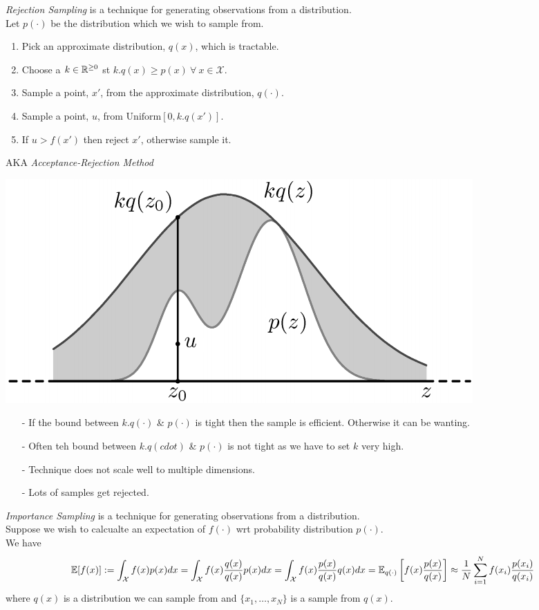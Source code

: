 \documentclass[11pt,a4paper]{article}
\begin{document}
\textit{Rejection Sampling} is a technique for generating observations from a distribution.\\
Let $p(\cdot)$ be the distribution which we wish to sample from.
\begin{enumerate}
	\item Pick an approximate distribution, $q(x)$, which is tractable.
	\item Choose a $k\in\mathbb{R}^{\geq0}$ st $k.q(x)\geq p(x)\ \forall\ x\in\mathcal{X}$.
	\item Sample a point, $x'$, from the approximate distribution, $q(\cdot)$.
	\item Sample a point, $u$, from $\text{Uniform}[0,k.q(x')]$.
	\item If $u>f(x')$ then reject $x'$, otherwise sample it.
\end{enumerate}
\nb AKA \textit{Acceptance-Rejection Method}
\begin{center}
\includegraphics[scale=.5]{img/rejectionSampling.png}
\end{center}

\begin{itemize}
	\item[-] If the bound between $k.q(\cdot)$ \& $p(\cdot)$ is tight then the sample is efficient. Otherwise it can be wanting.
	\item[-] Often teh bound between $k.q(cdot)$ \& $p(\cdot)$ is not tight as we have to set $k$ very high.
	\item[-] Technique does not scale well to multiple dimensions.
	\item[-] Lots of samples get rejected.
\end{itemize}

\textit{Importance Sampling} is a technique for generating observations from a distribution.\\
Suppose we wish to calcualte an expectation of $f(\cdot)$ wrt probability distribution $p(\cdot)$.\\
We have
$$\displaystyle{\mathbb{E}[f(x)]:=\int_\mathcal{X} f(x)p(x)dx=\int_\mathcal{X} f(x)\frac{q(x)}{q(x)}p(x)dx=\int_\mathcal{X} f(x)\frac{p(x)}{q(x)}q(x)dx=\mathbb{E}_{q(\cdot)}\left[f(x)\frac{p(x)}{q(x)}\right]\approx\frac{1}{N}\sum_{i=1}^Nf(x_i)\frac{p(x_i)}{q(x_i)}}$$
where $q(x)$ is a distribution we can sample from and $\{x_1,\dots,x_N\}$ is a sample from $q(x)$.\\
\end{document}
